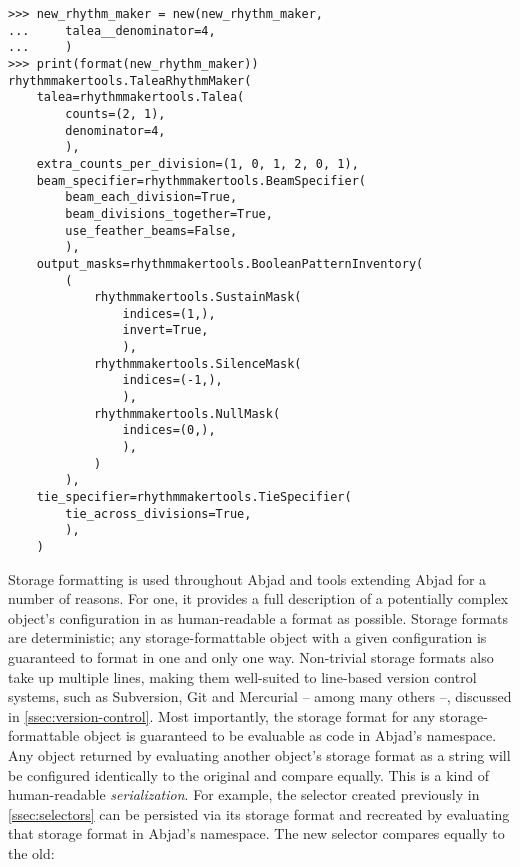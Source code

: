 \begin{abjadbookoutput}
\begin{singlespacing}
\vspace{-0.5\baselineskip}
\begin{verbatim}
>>> new_rhythm_maker = new(new_rhythm_maker,
...     talea__denominator=4,
...     )
>>> print(format(new_rhythm_maker))
rhythmmakertools.TaleaRhythmMaker(
    talea=rhythmmakertools.Talea(
        counts=(2, 1),
        denominator=4,
        ),
    extra_counts_per_division=(1, 0, 1, 2, 0, 1),
    beam_specifier=rhythmmakertools.BeamSpecifier(
        beam_each_division=True,
        beam_divisions_together=True,
        use_feather_beams=False,
        ),
    output_masks=rhythmmakertools.BooleanPatternInventory(
        (
            rhythmmakertools.SustainMask(
                indices=(1,),
                invert=True,
                ),
            rhythmmakertools.SilenceMask(
                indices=(-1,),
                ),
            rhythmmakertools.NullMask(
                indices=(0,),
                ),
            )
        ),
    tie_specifier=rhythmmakertools.TieSpecifier(
        tie_across_divisions=True,
        ),
    )
\end{verbatim}
\end{singlespacing}
\end{abjadbookoutput}

\noindent Storage formatting is used throughout Abjad and tools extending Abjad
for a number of reasons. For one, it provides a full description of a
potentially complex object's configuration in as human-readable a format as
possible. Storage formats are deterministic; any storage-formattable object
with a given configuration is guaranteed to format in one and only one way.
Non-trivial storage formats also take up multiple lines, making them
well-suited to line-based version control systems, such as Subversion, Git and
Mercurial -- among many others --, discussed in \autoref{ssec:version-control}.
Most importantly, the storage format for any storage-formattable object is
guaranteed to be evaluable as code in Abjad's namespace. Any object returned by
evaluating another object's storage format as a string will be configured
identically to the original and compare equally. This is a kind of
human-readable \emph{serialization}. For example, the selector created
previously in \autoref{ssec:selectors} can be persisted via its storage format
and recreated by evaluating that storage format in Abjad's namespace. The new
selector compares equally to the old:

